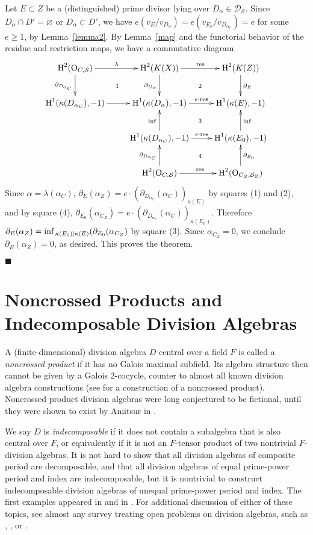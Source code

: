 \documentclass{amsart}
\theoremstyle{plain}
\theoremstyle{definition}
\theoremstyle{remark}
\numberwithin{equation}{section}%
\renewcommand{\H}{{\text{\rm H}}}
\renewcommand{\O}{{\text{\rm O}}}
\renewcommand{\S}{{\mathcal S}}
\renewcommand{\inf}{{\text{\rm inf}\,}}
\newcommand{\res}{{\text{\rm res}}}
\begin{document}
Let $E\subset Z$ be a (distinguished) prime divisor lying over $D_\alpha\in\mathscr D_\S$.
Since $D_\alpha\cap D'=\varnothing$ or $D_\alpha\subset D'$,
we have $e(v_E/v_{D_\alpha})=e(v_{E_0}/v_{D_{\alpha_C}})=e$ for some $e\geq 1$,
by Lemma~\ref{lemma2}.
By Lemma~\ref{map} and the functorial behavior of the residue and restriction
maps, we have a commutative diagram
\[\xymatrix{
\H^2(\O_{C,\S})\ar[d]_{\partial_{D_{\alpha_C}}}\ar[r]^-\lambda\ar@{}[dr]|{1}&\H^2(K(X))\ar[d]_{\partial_{D_\alpha}}
\ar[r]^-\res\ar@{}[dr]|{2}&\H^2(K(Z))\ar[d]^{\partial_E}\\
\H^1(\kappa(D_{\alpha_C}),-1)\ar[r]&\H^1(\kappa({D_\alpha}),-1)\ar[r]^-{e\cdot\res}\ar@{}[dr]|{3}&\H^1(\kappa(E),-1)\\
&\H^1(\kappa(D_{\alpha_C}),-1)\ar[r]^-{e\cdot\res}\ar[u]^\inf\ar@{}[dr]|{4}&\H^1(\kappa(E_0),-1)\ar[u]_\inf\\
&\H^2(\O_{C,\S})\ar[u]^{\partial_{D_{\alpha_C}}}\ar[r]^\res&\H^2(\O_{C_Z,\mathcal S_Z})\ar[u]_{\partial_{E_0}}\\
}\]
Since $\alpha=\lambda(\alpha_C)$, 
$\partial_E(\alpha_Z)=e\cdot(\partial_{D_{\alpha_C}}(\alpha_C))_{\kappa(E)}$
by squares (1) and (2), and by square (4),
$\partial_{E_0}(\alpha_{C_Z})=e\cdot(\partial_{D_{\alpha_C}}(\alpha_C))_{\kappa(E_0)}$.
Therefore $\partial_E(\alpha_Z)=\inf_{\kappa(E_0)|\kappa(E)}(\partial_{E_0}(\alpha_{C_Z})$ 
by square (3).
Since 
$\alpha_{C_Z}=0$, we conclude $\partial_E(\alpha_Z)=0$,
as desired.
This proves the theorem.

\hfill $\blacksquare$

\section{Noncrossed Products and Indecomposable Division Algebras}

A (finite-dimensional) 
division algebra $D$ central over a field $F$ is called a {\it noncrossed product}
if it has no Galois maximal subfield.  Its algebra structure then cannot be given
by a Galois 2-cocycle, counter to almost all known division algebra constructions
(see \cite{Ha85} for a construction of a noncrossed product).  
Noncrossed product division algebras were long conjectured to be fictional, until they
were shown to exist by Amitsur in \cite{Am72}. 

We say $D$ is {\it indecomposable} if it does not contain a subalgebra that is also
central over $F$, or equivalently if it is not an $F$-tensor product of two nontrivial
$F$-division algebras.  It is not hard to show that all division algebras of composite period
are decomposable, and that all division algebras of equal prime-power period 
and index are indecomposable, but it is nontrivial to construct indecomposable division algebras of unequal
prime-power period and index.  
The first examples appeared in \cite{ART} and in \cite{Sa79}.
For additional discussion of either of these
topics, see almost any survey treating open problems on division algebras, such as
\cite{ABGV}, \cite{Am82}, or \cite{Sa92}.
\end{document}
